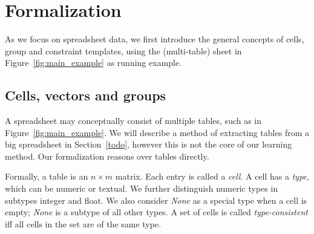 \documentclass{sig-alternate-05-2015}
\begin{document}
\section{Formalization}
As we focus on spreadsheet data, we first introduce the general concepts of cells, group and constraint templates, using the (multi-table) sheet in Figure~\ref{fig:main_example} as running example.

\subsection{Cells, vectors and groups}
A spreadsheet may conceptually consist of multiple tables, such as in Figure~\ref{fig:main_example}. We will describe a method of extracting tables from a big spreadsheet in Section~\ref{todo}, however this is not the core of our learning method. Our formalization reasons over tables directly.

Formally, a table is an $n \times m$ matrix. Each entry is called a \textit{cell}.
A cell has a {\em type}, which can be numeric or textual. We further distinguish numeric types in subtypes integer and float. We also consider \textit{None} as a special type when a cell is empty; \textit{None} is a subtype of all other types.
A set of cells is called \textit{type-consistent} iff all cells in the set are of the same type.
\end{document}
